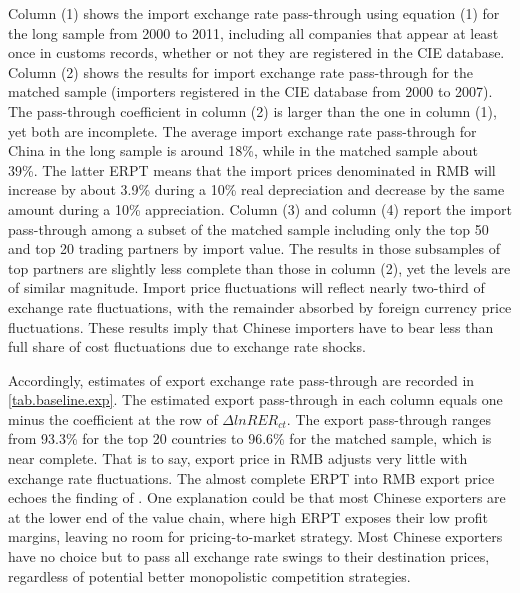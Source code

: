 \documentclass[12pt]{article}
\begin{document}
Column (1) shows the import exchange rate pass-through using equation (1) for the long sample from 2000 to 2011, including all companies that appear at least once in customs records, whether or not they are registered in the CIE database. Column (2) shows the results for import exchange rate pass-through for the matched sample (importers registered in the CIE database from 2000 to 2007). The pass-through coefficient in column (2) is larger than the one in column (1), yet both are incomplete. The average import exchange rate pass-through for China in the long sample is around 18\%, while in the matched sample about 39\%. The latter ERPT means that the import prices denominated in RMB will increase by about 3.9\% during a 10\% real depreciation and decrease by the same amount during a 10\% appreciation. Column (3) and column (4) report the import pass-through among a subset of the matched sample including only the top 50 and top 20 trading partners by import value. The results in those subsamples of top partners are slightly less complete than those in column (2), yet the levels are of similar magnitude. Import price fluctuations will reflect nearly two-third of exchange rate fluctuations, with the remainder absorbed by foreign currency price fluctuations. These results imply that Chinese importers have to bear less than full share of cost fluctuations due to exchange rate shocks. 

Accordingly, estimates of export exchange rate pass-through are recorded in \ref{tab.baseline.exp}. The estimated export pass-through in each column equals one minus the coefficient at the row of $\Delta lnRER_{ct}$. The export pass-through ranges from 93.3\% for the top 20 countries to 96.6\% for the matched sample, which is near complete. That is to say, export price in RMB adjusts very little with exchange rate fluctuations. The almost complete ERPT into RMB export price echoes the finding of \cite{lmx2015}. One explanation could be that most Chinese exporters are at the lower end of the value chain, where high ERPT exposes their low profit margins, leaving no room for pricing-to-market strategy. Most Chinese exporters have no choice but to pass all exchange rate swings to their destination prices, regardless of potential better monopolistic competition strategies. 
\end{document}
